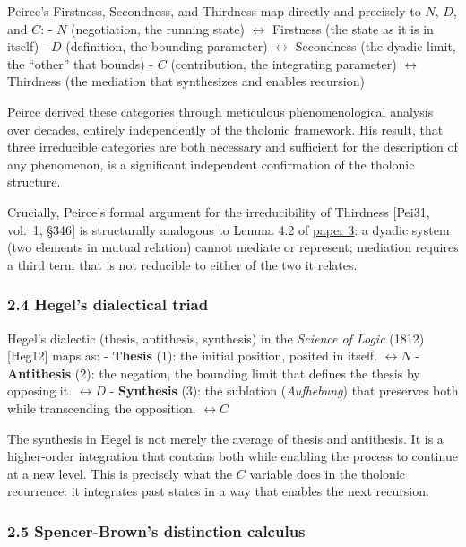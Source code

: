 \documentclass[
  11pt,
  letterpaper,
]{article}
\begin{document}
Peirce's Firstness, Secondness, and Thirdness map directly and precisely
to \(N\), \(D\), and \(C\): - \(N\) (negotiation, the running state)
\(\leftrightarrow\) Firstness (the state as it is in itself) - \(D\)
(definition, the bounding parameter) \(\leftrightarrow\) Secondness (the
dyadic limit, the ``other'' that bounds) - \(C\) (contribution, the
integrating parameter) \(\leftrightarrow\) Thirdness (the mediation that
synthesizes and enables recursion)

Peirce derived these categories through meticulous phenomenological
analysis over decades, entirely independently of the tholonic framework.
His result, that three irreducible categories are both necessary and
sufficient for the description of any phenomenon, is a significant
independent confirmation of the tholonic structure.

Crucially, Peirce's formal argument for the irreducibility of Thirdness
{[}Pei31, vol.~1, §346{]} is structurally analogous to Lemma 4.2 of
\href{https://github.com/baardev/truevalue/blob/main/docnav/Research/papers/3_minimal-recursive-triadic-framework/3_minimal-recursive-triadic-framework.pdf}{paper
3}: a dyadic system (two elements in mutual relation) cannot mediate or
represent; mediation requires a third term that is not reducible to
either of the two it relates.

\subsubsection{2.4 Hegel's dialectical
triad}\label{hegels-dialectical-triad}

Hegel's dialectic (thesis, antithesis, synthesis) in the \emph{Science
of Logic} (1812) {[}Heg12{]} maps as: - \textbf{Thesis} (1): the initial
position, posited in itself. \(\leftrightarrow N\) - \textbf{Antithesis}
(2): the negation, the bounding limit that defines the thesis by
opposing it. \(\leftrightarrow D\) - \textbf{Synthesis} (3): the
sublation (\emph{Aufhebung}) that preserves both while transcending the
opposition. \(\leftrightarrow C\)

The synthesis in Hegel is not merely the average of thesis and
antithesis. It is a higher-order integration that contains both while
enabling the process to continue at a new level. This is precisely what
the \(C\) variable does in the tholonic recurrence: it integrates past
states in a way that enables the next recursion.

\subsubsection{2.5 Spencer-Brown's distinction
calculus}\label{spencer-browns-distinction-calculus}
\end{document}
